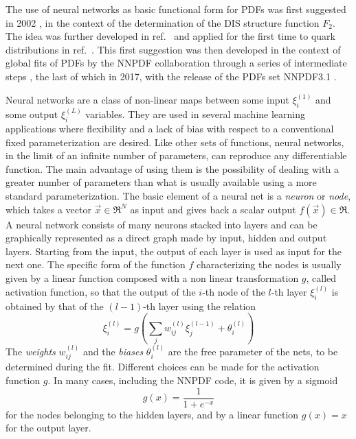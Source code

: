 %
The use of neural networks as basic functional form for PDFs was first suggested in 2002 \cite{Forte:2002fg},
in the context of the determination of the DIS structure function $F_2$. 
The idea was further developed in ref.~\cite{DelDebbio:2004xtd} and applied for the first time to quark
distributions in ref.~\cite{DelDebbio:2007ee}. This first suggestion was then developed in the context of 
global fits of PDFs by the NNPDF collaboration through a series of intermediate steps 
\cite{Ball:2008by, Ball:2010de, Ball:2012cx, Ball:2014uwa}, the last of which in 2017, with the
release of the PDFs set NNPDF3.1 \cite{Ball:2017nwa}.

%
Neural networks are a class of non-linear maps between some input $\xi_i^{(1)} $ 
and some output $\xi_i^{(L)} $ variables. They are used in several machine learning applications where flexibility
and a lack of bias with respect to a conventional fixed parameterization  are  desired. 
Like other sets of functions, neural networks, in the limit of an infinite number of parameters, 
can reproduce any differentiable function. The main advantage of using them is the possibility of dealing 
with a greater number of parameters than what is usually available using a more standard parameterization.
The basic element of a neural net is a \textit{neuron} or \textit{node}, which takes a vector $\vec{x} \in \Re^N $ 
as input and gives back a scalar output $ f\left(\vec{x}\right) \in \Re$.
A neural network consists of many neurons stacked into layers and can be graphically represented as a direct graph made by input,
hidden and output layers.
Starting from the input, the output of each layer is used as input for the next one. 
The specific form of the function $f$ characterizing the nodes is usually given by a linear function 
composed with a non linear transformation $g$, called activation function, so that the output of the $i$-th node of 
the $l$-th layer $\xi_i^{(l)}$ is obtained by that of the $(l-1)$-th layer using the relation
\begin{equation}
\label{nodes}
\xi_i^{(l)}= g\left(\sum_jw_{ij}^{(l)}\xi_j^{(l-1)}+\theta_i^{(l)}\right)
\end{equation}
The \textit{weights} $w_{ij}^{(l)} $ and the \textit{biases} $\theta_i^{(l)} $ are the free parameter of the nets, 
to be determined during the fit.
Different choices can be made for the activation function $g$. 
In many cases, including the NNPDF code, it is given by a sigmoid
\begin{equation}
\label{sigmoid}
g\left(x\right)=\frac{1}{1+e^{-x}}
\end{equation}
for the nodes belonging to the hidden layers, and by a linear function $ g(x)=x $ for the output layer.
 
